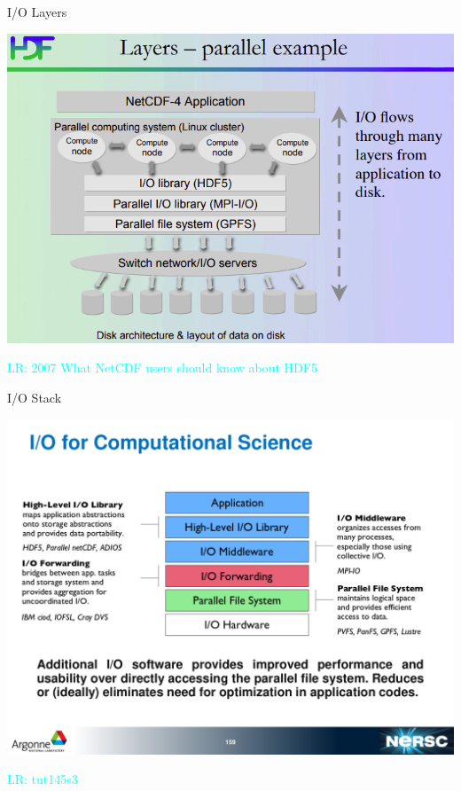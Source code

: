 \documentclass[compress,11pt,xcolor=svgnames,aspectratio=169]{beamer}
\newcommand{\lr}[1]{\textcolor{cyan}{LR: #1}}
\begin{document}
\begin{frame}[t]{I/O Layers}

\begin{center}
\includegraphics[scale=0.5]{fig/io-layers}
\end{center}

\lr{2007 What NetCDF users should know about HDF5}

\end{frame}

\begin{frame}[t]{I/O Stack}

\begin{center}
\includegraphics[scale=0.5]{fig/io-stack2}
\end{center}

\lr{tut145s3}

\end{frame}
\end{document}
